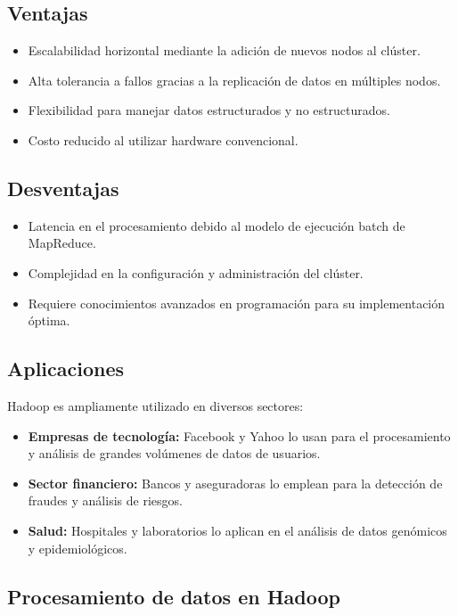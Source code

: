 \documentclass[12pt]{article}
\begin{document}
\subsection{Ventajas}
\begin{itemize}
    \item Escalabilidad horizontal mediante la adición de nuevos nodos al clúster.
    \item Alta tolerancia a fallos gracias a la replicación de datos en múltiples nodos.
    \item Flexibilidad para manejar datos estructurados y no estructurados.
    \item Costo reducido al utilizar hardware convencional.
\end{itemize}

\subsection{Desventajas}
\begin{itemize}
    \item Latencia en el procesamiento debido al modelo de ejecución batch de MapReduce.
    \item Complejidad en la configuración y administración del clúster.
    \item Requiere conocimientos avanzados en programación para su implementación óptima.
\end{itemize}

\subsection{Aplicaciones}
Hadoop es ampliamente utilizado en diversos sectores:
\begin{itemize}
    \item \textbf{Empresas de tecnología:} Facebook y Yahoo lo usan para el procesamiento y análisis de grandes volúmenes de datos de usuarios.
    \item \textbf{Sector financiero:} Bancos y aseguradoras lo emplean para la detección de fraudes y análisis de riesgos.
    \item \textbf{Salud:} Hospitales y laboratorios lo aplican en el análisis de datos genómicos y epidemiológicos.
\end{itemize}

\subsection{Procesamiento de datos en Hadoop}
\end{document}
